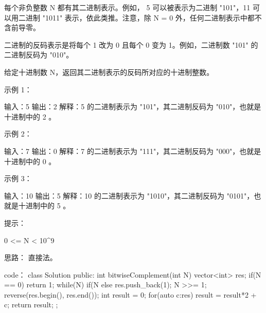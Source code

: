 每个非负整数 N 都有其二进制表示。例如， 5 可以被表示为二进制 "101"，11 可以用二进制 "1011" 表示，依此类推。注意，除 N = 0 外，任何二进制表示中都不含前导零。

二进制的反码表示是将每个 1 改为 0 且每个 0 变为 1。例如，二进制数 "101" 的二进制反码为 "010"。

给定十进制数 N，返回其二进制表示的反码所对应的十进制整数。

 

示例 1：

输入：5
输出：2
解释：5 的二进制表示为 "101"，其二进制反码为 "010"，也就是十进制中的 2 。

示例 2：

输入：7
输出：0
解释：7 的二进制表示为 "111"，其二进制反码为 "000"，也就是十进制中的 0 。

示例 3：

输入：10
输出：5
解释：10 的二进制表示为 "1010"，其二进制反码为 "0101"，也就是十进制中的 5 。

 

提示：

    0 <= N < 10^9

































思路：
直接法。


































code：
class Solution {
public:
    int bitwiseComplement(int N) {
        vector<int> res;
        if(N == 0) return 1;
        while(N)
        {
            if(N %
            else res.push_back(1);
            N >>= 1;
        }
        reverse(res.begin(), res.end());
        int result = 0;
        for(auto c:res)  result = result*2 + c;
        return result;
    }
};